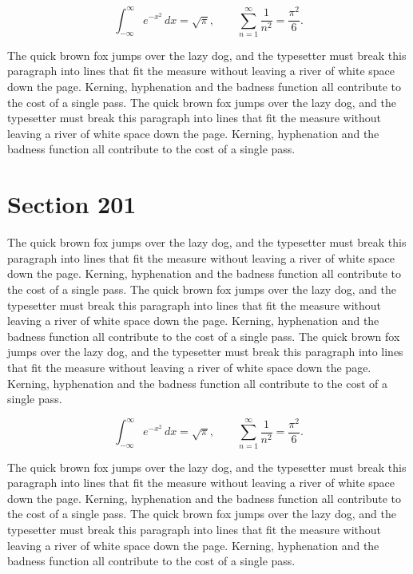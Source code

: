 \documentclass{article}
\begin{document}
\begin{equation}
\int_{-\infty}^{\infty} e^{-x^{2}}\,dx = \sqrt{\pi}, \qquad
\sum_{n=1}^{\infty} \frac{1}{n^{2}} = \frac{\pi^{2}}{6}.
\end{equation}

The quick brown fox jumps over the lazy dog, and the typesetter must break this paragraph into lines that fit the measure without leaving a river of white space down the page. Kerning, hyphenation and the badness function all contribute to the cost of a single pass. The quick brown fox jumps over the lazy dog, and the typesetter must break this paragraph into lines that fit the measure without leaving a river of white space down the page. Kerning, hyphenation and the badness function all contribute to the cost of a single pass. 
\section{Section 201}
The quick brown fox jumps over the lazy dog, and the typesetter must break this paragraph into lines that fit the measure without leaving a river of white space down the page. Kerning, hyphenation and the badness function all contribute to the cost of a single pass. The quick brown fox jumps over the lazy dog, and the typesetter must break this paragraph into lines that fit the measure without leaving a river of white space down the page. Kerning, hyphenation and the badness function all contribute to the cost of a single pass. The quick brown fox jumps over the lazy dog, and the typesetter must break this paragraph into lines that fit the measure without leaving a river of white space down the page. Kerning, hyphenation and the badness function all contribute to the cost of a single pass. 

\begin{equation}
\int_{-\infty}^{\infty} e^{-x^{2}}\,dx = \sqrt{\pi}, \qquad
\sum_{n=1}^{\infty} \frac{1}{n^{2}} = \frac{\pi^{2}}{6}.
\end{equation}

The quick brown fox jumps over the lazy dog, and the typesetter must break this paragraph into lines that fit the measure without leaving a river of white space down the page. Kerning, hyphenation and the badness function all contribute to the cost of a single pass. The quick brown fox jumps over the lazy dog, and the typesetter must break this paragraph into lines that fit the measure without leaving a river of white space down the page. Kerning, hyphenation and the badness function all contribute to the cost of a single pass. 
\end{document}
